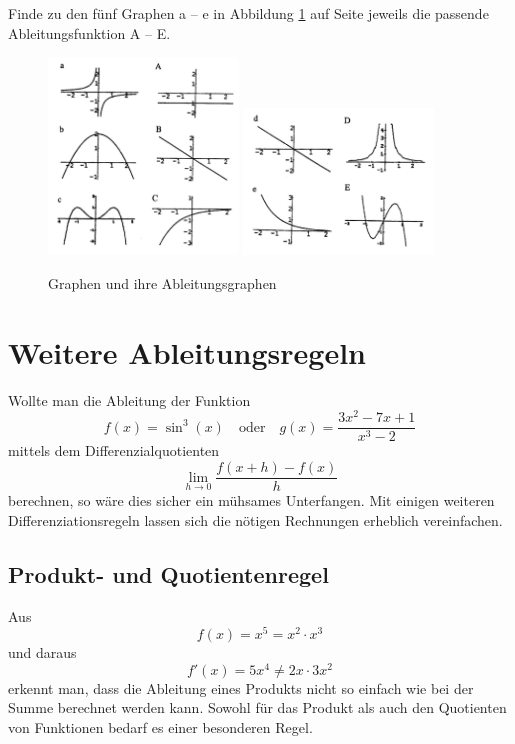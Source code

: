 \documentclass[%
11pt,%
twoside,%
titlepage,%
german,%
headsepline%
]{scrartcl}
\begin{document}
\begin{ueb}[match]
Finde
zu den fünf Graphen a -- e in Abbildung \ref{derive} auf Seite \pageref{derive} jeweils die passende Ableitungsfunktion A -- E.

\begin{figure}
\begin{center}
\includegraphics[width=0.45\textwidth,angle=0.6]{pictures/derivates1}
\includegraphics[width=0.45\textwidth,angle=0.6]{pictures/derivates2}
\end{center}
\caption{Graphen und ihre Ableitungsgraphen}\label{derive}
\end{figure}
\end{ueb}

\clearpage

\section{Weitere Ableitungsregeln}
Wollte man die Ableitung der Funktion
$$f(x)=\sin^3(x)\quad\text{oder}\quad g(x)=\frac{3x^2-7x+1}{x^3-2}$$
mittels dem Differenzialquotienten
$$\lim_{h\to0}\frac{f(x+h)-f(x)}{h}$$
berechnen, so w\"are dies sicher ein m\"uhsames Unterfangen. Mit einigen weiteren Differenziationsregeln lassen sich die n\"otigen Rechnungen erheblich vereinfachen.
\subsection{Produkt- und Quotientenregel}
Aus
$$f(x)=x^5=x^2\cdot x^3$$
und daraus
$$f'(x)=5x^4\neq 2x\cdot3x^2$$
erkennt man, dass die Ableitung eines Produkts nicht so einfach wie bei der Summe berechnet werden kann. Sowohl f\"ur das Produkt als auch den Quotienten von Funktionen bedarf es einer besonderen Regel.
\end{document}
